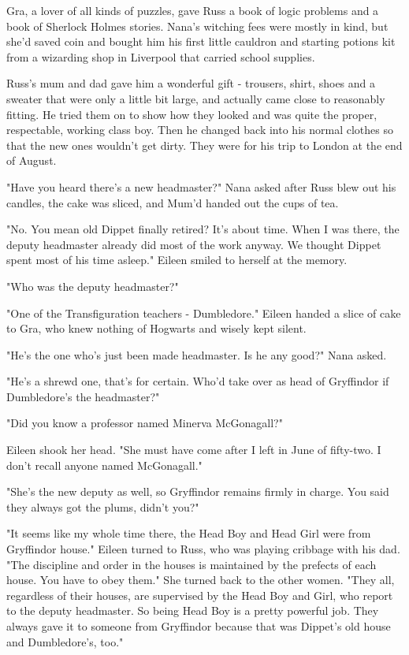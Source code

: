 \documentclass[a4paper,11pt]{article}
\begin{document}
Gra, a lover of all kinds of puzzles, gave Russ a book of logic problems and a book of Sherlock Holmes stories. Nana's witching fees were mostly in kind, but she'd saved coin and bought him his first little cauldron and starting potions kit from a wizarding shop in Liverpool that carried school supplies.

Russ's mum and dad gave him a wonderful gift - trousers, shirt, shoes and a sweater that were only a little bit large, and actually came close to reasonably fitting. He tried them on to show how they looked and was quite the proper, respectable, working class boy. Then he changed back into his normal clothes so that the new ones wouldn't get dirty. They were for his trip to London at the end of August.

"Have you heard there's a new headmaster?" Nana asked after Russ blew out his candles, the cake was sliced, and Mum'd handed out the cups of tea.

"No. You mean old Dippet finally retired? It's about time. When I was there, the deputy headmaster already did most of the work anyway. We thought Dippet spent most of his time asleep." Eileen smiled to herself at the memory.

"Who was the deputy headmaster?"

"One of the Transfiguration teachers - Dumbledore." Eileen handed a slice of cake to Gra, who knew nothing of Hogwarts and wisely kept silent.

"He's the one who's just been made headmaster. Is he any good?" Nana asked.

"He's a shrewd one, that's for certain. Who'd take over as head of Gryffindor if Dumbledore's the headmaster?"

"Did you know a professor named Minerva McGonagall?"

Eileen shook her head. "She must have come after I left in June of fifty-two. I don't recall anyone named McGonagall."

"She's the new deputy as well, so Gryffindor remains firmly in charge. You said they always got the plums, didn't you?"

"It seems like my whole time there, the Head Boy and Head Girl were from Gryffindor house." Eileen turned to Russ, who was playing cribbage with his dad. "The discipline and order in the houses is maintained by the prefects of each house. You have to obey them." She turned back to the other women. "They all, regardless of their houses, are supervised by the Head Boy and Girl, who report to the deputy headmaster. So being Head Boy is a pretty powerful job. They always gave it to someone from Gryffindor because that was Dippet's old house and Dumbledore's, too."
\end{document}
